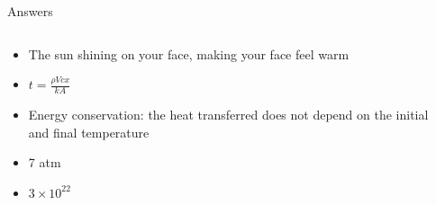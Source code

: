 \documentclass{beamer}
\begin{document}
\begin{frame}{Answers}
\small
\begin{columns}[T]
\begin{column}{0.5\textwidth}
\begin{itemize}
\item The sun shining on your face, making your face feel warm
\item $t = \frac{\rho Vcx}{kA}$
\item Energy conservation: the heat transferred does not depend on the initial and final temperature
\item 7 atm
\item $3 \times 10^{22}$
\end{itemize}
\end{column}
\begin{column}{0.5\textwidth}
\end{column}
\end{columns}
\end{frame}
\end{document}

